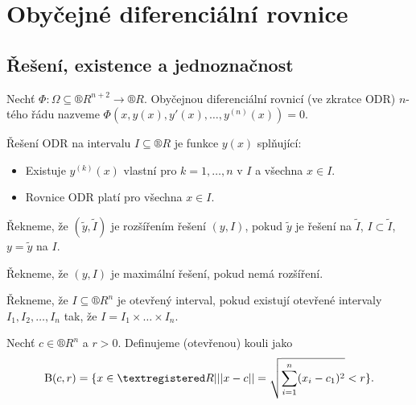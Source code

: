 \documentclass[12pt]{article}                   %
\begin{document}

\section{Obyčejné diferenciální rovnice}
    \subsection{Řešení, existence a jednoznačnost}
        \begin{definice}[ODR]
            Nechť $\Phi: \Omega \subseteq ®R^{n+2} \rightarrow ®R$. Obyčejnou diferenciální rovnicí (ve zkratce ODR) $n$-tého řádu nazveme $\Phi(x, y(x), y'(x), …, y^{(n)}(x)) = 0$.
        \end{definice}

        \begin{definice}
            Řešení ODR na intervalu $I \subseteq ®R$ je funkce $y(x)$ splňující:
            
            \begin{itemize}
                \item Existuje $y^{(k)}(x)$ vlastní pro $k = 1, …, n$ v $I$ a všechna $x \in I$.
                \item Rovnice ODR platí pro všechna $x \in I$.
            \end{itemize}
        \end{definice}

        \begin{definice}
            Řekneme, že $(\tilde{y}, \tilde{I})$ je rozšířením řešení $(y, I)$, pokud $\tilde{y}$ je řešení na $\tilde{I}$, $I \subset \tilde{I}$, $y = \tilde{y}$ na $I$.

            Řekneme, že $(y, I)$ je maximální řešení, pokud nemá rozšíření.
        \end{definice}

        \begin{definice}
            Řekneme, že $I \subseteq ®R^n$ je otevřený interval, pokud existují otevřené intervaly $I_1, I_2, …, I_n$ tak, že $I = I_1 \times … \times I_n$.
        \end{definice}

        \begin{definice}
            Nechť $c \in ®R^n$ a $r > 0$. Definujeme (otevřenou) kouli jako
            $$ \B(c, r) = \{x \in ®R | ||x-c|| = \sqrt{\sum_{i=1}^n (x_i - c_1)^2} < r\}. $$ 
        \end{definice}
\end{document}
